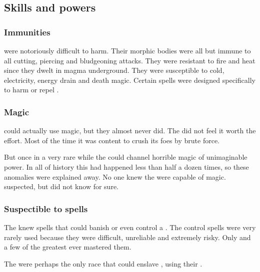 \subsection{Skills and powers}





\subsubsection{Immunities}
\Noggyaleth were notoriously difficult to harm. 
Their morphic bodies were all but immune to all cutting, piercing and bludgeoning attacks.
They were resistant to fire and heat since they dwelt in magma underground. 
They were susceptible to cold, electricity, energy drain and death magic. 
Certain spells were designed specifically to harm or repel \noggyaleth. 





\subsubsection{Magic}
\Noggyaleth could actually use magic, but they almost never did.
The  did not feel it worth the effort.
Most of the time it was content to crush its foes by brute force. 

But once in a very rare while the \noggyaleth could channel horrible magic of unimaginable power. 
In all of \ophidian history this had happened less than half a dozen times, so these anomalies were explained away.
No one knew the \noggyaleth were capable of magic.
\Sethicus suspected, but did not know for sure. 





\subsubsection{Suspectible to spells}
The \ophidians knew spells that could banish or even control a \noggyal.
The control spells were very rarely used because they were difficult, unreliable and extremely risky. 
Only \Sethicus and a few of the greatest \dragons ever mastered them.

The \shugul were perhaps the only race that could enslave \noggyaleth, using their .















